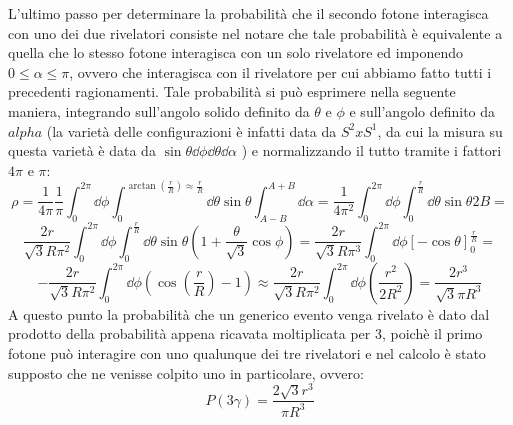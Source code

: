  L'ultimo passo per determinare la probabilità che il secondo fotone interagisca con uno dei due rivelatori consiste nel notare che tale probabilità è equivalente a quella
  che lo stesso fotone interagisca con un solo rivelatore ed imponendo \(0 \le \alpha \le \pi\), ovvero che interagisca con il rivelatore per cui abbiamo fatto tutti i precedenti
  ragionamenti. Tale probabilità si può esprimere nella seguente maniera, integrando sull'angolo solido definito da \(\theta\) e \(\phi\) e sull'angolo definito da \(alpha\)
  (la varietà delle configurazioni è infatti data da \(S^2 x S^1\), da cui la misura su questa varietà è data da \(\sin \theta \dd\phi \dd\theta \dd\alpha\) ) e normalizzando il tutto
  tramite i fattori \(4 \pi\) e \(\pi\):
  $$ \rho = \frac{1}{4\pi}\frac{1}{\pi}\int_{0}^{2\pi} \dd\phi \int_{0}^{\arctan\left(\frac{r}{R}\right)\approx \frac{r}{R}} \dd\theta \sin \theta \int_{A-B}^{A+B} \dd\alpha = 
  \frac{1}{4 \pi^2}\int_{0}^{2\pi} \dd\phi \int_{0}^{\frac{r}{R}} \dd\theta \sin \theta 2B =$$
  $$ \frac{2r}{\sqrt{3}R \pi^2}\int_{0}^{2\pi} \dd\phi \int_{0}^{\frac{r}{R}} \dd\theta \sin \theta \left( 1 +\frac{\theta}{\sqrt{3}} \cos \phi \right) =
  \frac{2r}{\sqrt{3} R \pi^3}\int_{0}^{2\pi} \dd\phi \left[ - \cos \theta \right]_{0}^{\frac{r}{R}} = $$ 
  $$- \frac{2r}{\sqrt{3} R \pi^2}\int_{0}^{2\pi} \dd\phi \left( \cos \left( \frac{r}{R} \right) -1 \right) \approx
  \frac{2r}{\sqrt{3} R \pi^2}\int_{0}^{2\pi} \dd\phi \left(\frac{r^2}{2R^2} \right) = \frac{2 r^3}{\sqrt{3} \pi R^3} $$
  A questo punto la probabilità che un generico evento venga rivelato è dato dal prodotto della probabilità appena ricavata moltiplicata per 3, poichè il primo fotone può
  interagire con uno qualunque dei tre rivelatori e nel calcolo è stato supposto che ne venisse colpito uno in particolare, ovvero:
  $$ P \left( 3 \gamma \right) = \frac{2 \sqrt{3} r^3}{ \pi R^3} $$
